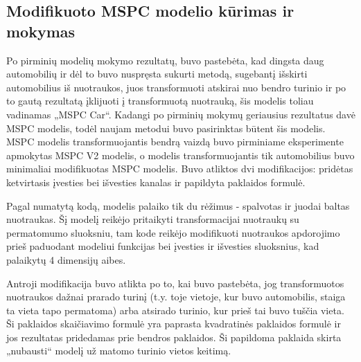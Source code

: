\documentclass{VUMIFPSbakalaurinis}
\begin{document}
    
    
    \subsection{Modifikuoto MSPC modelio kūrimas ir mokymas}
        Po pirminių modelių mokymo rezultatų, buvo pastebėta, kad dingsta daug automobilių ir dėl to buvo nuspręsta sukurti metodą, sugebantį išskirti automobilius iš nuotraukos, juos transformuoti atskirai nuo bendro turinio ir po to gautą rezultatą įklijuoti į transformuotą nuotrauką, šis modelis toliau vadinamas „MSPC Car“. Kadangi po pirminių mokymų geriausius rezultatus davė MSPC modelis, todėl naujam metodui buvo pasirinktas būtent šis modelis. MSPC modelis transformuojantis bendrą vaizdą buvo pirminiame eksperimente apmokytas MSPC V2 modelis, o modelis transformuojantis tik automobilius buvo minimaliai modifikuotas MSPC modelis. Buvo atliktos dvi modifikacijos: pridėtas ketvirtasis įvesties bei išvesties kanalas ir papildyta paklaidos formulė. 
        
        Pagal numatytą kodą, modelis palaiko tik du rėžimus - spalvotas ir juodai baltas nuotraukas. Šį modelį reikėjo pritaikyti transformacijai nuotraukų su permatomumo sluoksniu, tam kode reikėjo modifikuoti nuotraukos apdorojimo prieš paduodant modeliui funkcijas bei įvesties ir išvesties sluoksnius, kad palaikytų 4 dimensijų aibes. 
        
        Antroji modifikacija buvo atlikta po to, kai buvo pastebėta, jog transformuotos nuotraukos dažnai prarado turinį (t.y. toje vietoje, kur buvo automobilis, staiga ta vieta tapo permatoma) arba atsirado turinio, kur prieš tai buvo tuščia vieta. Ši paklaidos skaičiavimo formulė yra paprasta kvadratinės paklaidos formulė ir jos rezultatas pridedamas prie bendros paklaidos. Ši papildoma paklaida skirta „nubausti“ modelį už matomo turinio vietos keitimą.
\end{document}
